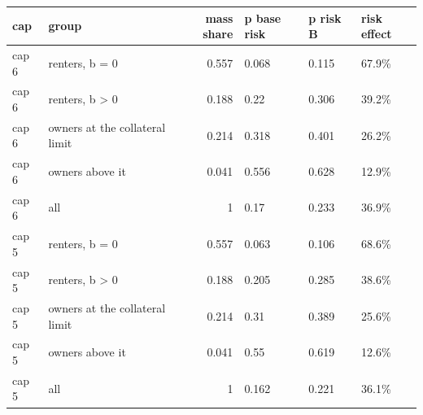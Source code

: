 \begingroup\small
\setlength{\tabcolsep}{3pt}
\renewcommand{\arraystretch}{1.04}
\begin{tabularx}{\linewidth}{XXrXXX}
\toprule
cap & group & mass share & p base risk & p risk B & risk effect \\
\midrule
cap 6 & renters, b = 0 & 0.557 & 0.068 & 0.115 & 67.9\% \\
cap 6 & renters, b \textgreater{} 0 & 0.188 & 0.22 & 0.306 & 39.2\% \\
cap 6 & owners at the collateral limit & 0.214 & 0.318 & 0.401 & 26.2\% \\
cap 6 & owners above it & 0.041 & 0.556 & 0.628 & 12.9\% \\
cap 6 & all & 1 & 0.17 & 0.233 & 36.9\% \\
cap 5 & renters, b = 0 & 0.557 & 0.063 & 0.106 & 68.6\% \\
cap 5 & renters, b \textgreater{} 0 & 0.188 & 0.205 & 0.285 & 38.6\% \\
cap 5 & owners at the collateral limit & 0.214 & 0.31 & 0.389 & 25.6\% \\
cap 5 & owners above it & 0.041 & 0.55 & 0.619 & 12.6\% \\
cap 5 & all & 1 & 0.162 & 0.221 & 36.1\% \\
\bottomrule
\end{tabularx}
\endgroup
